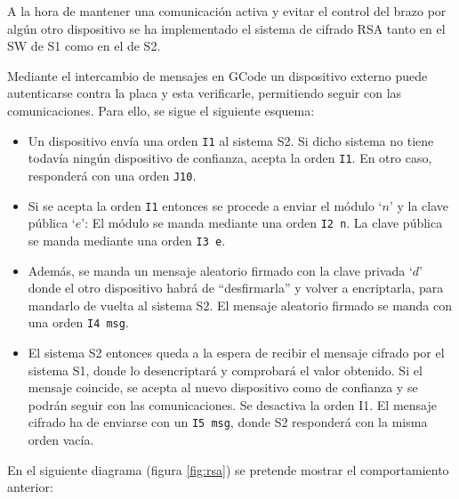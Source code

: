A la hora de mantener una comunicación activa y evitar el control del brazo
por algún otro dispositivo se ha implementado el sistema de cifrado RSA tanto en el
\ac{SW} de \ac{S1} como en el de \ac{S2}.

Mediante el intercambio de mensajes en GCode un dispositivo externo puede autenticarse
contra la placa y esta verificarle, permitiendo seguir con las comunicaciones. Para
ello, se sigue el siguiente esquema:
\begin{itemize}
    \item Un dispositivo envía una orden \texttt{I1} al sistema \ac{S2}. Si dicho
    sistema no tiene todavía ningún dispositivo de confianza, acepta la orden \texttt{I1}.
    En otro caso, responderá con una orden \texttt{J10}.
    
    \item Si se acepta la orden \texttt{I1} entonces se procede a enviar el módulo
    `$n$' y la clave pública `$e$':
        \subitem El módulo se manda mediante una orden \texttt{I2 n}.
        \subitem La clave pública se manda mediante una orden \texttt{I3 e}.
    
    \item Además, se manda un mensaje aleatorio firmado con la clave privada `$d$'
    donde el otro dispositivo habrá de ``desfirmarla'' y volver a encriptarla, para
    mandarlo de vuelta al sistema \ac{S2}.
        \subitem El mensaje aleatorio firmado se manda con una orden \texttt{I4 msg}.
    
    \item El sistema \ac{S2} entonces queda a la espera de recibir el mensaje
    cifrado por el sistema \ac{S1}, donde lo desencriptará y comprobará el valor obtenido.
    Si el mensaje coincide, se acepta al nuevo dispositivo como de confianza y se podrán
    seguir con las comunicaciones. Se desactiva la orden I1.
        \subitem El mensaje cifrado ha de enviarse con un \texttt{I5 msg}, donde \ac{S2}
        responderá con la misma orden vacía.
\end{itemize}

En el siguiente diagrama (figura \ref{fig:rsa}) se pretende mostrar el comportamiento anterior:

